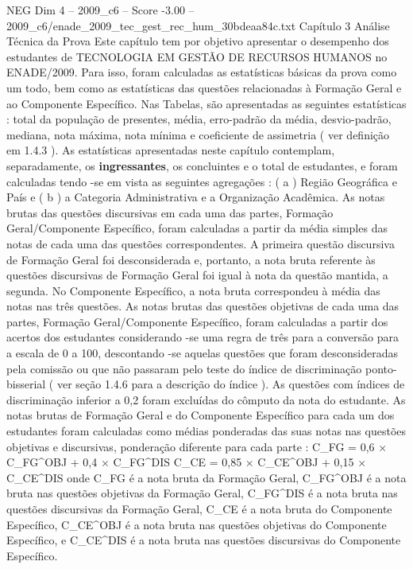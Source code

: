 \begin{textsample}{NEG Dim 4 – 2009\_c6 – Score -3.00 – 2009\_c6/enade\_2009\_tec\_gest\_rec\_hum\_30bdeaa84c.txt}  \label{ex:f4_neg_040}
Capítulo 3 Análise Técnica da Prova Este capítulo tem por objetivo apresentar o desempenho dos estudantes de TECNOLOGIA EM GESTÃO DE RECURSOS HUMANOS no ENADE/2009.
Para isso, foram calculadas as estatísticas básicas da prova como um todo, bem como as estatísticas das questões relacionadas à Formação Geral e ao Componente Específico.
Nas Tabelas, são apresentadas as seguintes estatísticas : total da população de presentes, média, erro-padrão da média, desvio-padrão, mediana, nota máxima, nota mínima e coeficiente de assimetria ( ver definição em 1.4.3 ).
As estatísticas apresentadas neste capítulo contemplam, separadamente, os \textbf{ingressantes}, os concluintes e o total de estudantes, e foram calculadas tendo -se em vista as seguintes agregações : ( a ) Região Geográfica e País e ( b ) a Categoria Administrativa e a Organização Acadêmica.
As notas brutas das questões discursivas em cada uma das partes, Formação Geral/Componente Específico, foram calculadas a partir da média simples das notas de cada uma das questões correspondentes.
A primeira questão discursiva de Formação Geral foi desconsiderada e, portanto, a nota bruta referente às questões discursivas de Formação Geral foi igual à nota da questão mantida, a segunda.
No Componente Específico, a nota bruta correspondeu à média das notas nas três questões.
As notas brutas das questões objetivas de cada uma das partes, Formação Geral/Componente Específico, foram calculadas a partir dos acertos dos estudantes considerando -se uma regra de três para a conversão para a escala de 0 a 100, descontando -se aquelas questões que foram desconsideradas pela comissão ou que não passaram pelo teste do índice de discriminação ponto-bisserial ( ver seção 1.4.6 para a descrição do índice ).
As questões com índices de discriminação inferior a 0,2 foram excluídas do cômputo da nota do estudante.
As notas brutas de Formação Geral e do Componente Específico para cada um dos estudantes foram calculadas como médias ponderadas das suas notas nas questões objetivas e discursivas, ponderação diferente para cada parte : C\_FG = 0,6 × C\_FG\textasciicircum{}OBJ + 0,4 × C\_FG\textasciicircum{}DIS C\_CE = 0,85 × C\_CE\textasciicircum{}OBJ + 0,15 × C\_CE\textasciicircum{}DIS onde C\_FG é a nota bruta da Formação Geral, C\_FG\textasciicircum{}OBJ é a nota bruta nas questões objetivas da Formação Geral, C\_FG\textasciicircum{}DIS é a nota bruta nas questões discursivas da Formação Geral, C\_CE é a nota bruta do Componente Específico, C\_CE\textasciicircum{}OBJ é a nota bruta nas questões objetivas do Componente Específico, e C\_CE\textasciicircum{}DIS é a nota bruta nas questões discursivas do Componente Específico.

\end{textsample}
